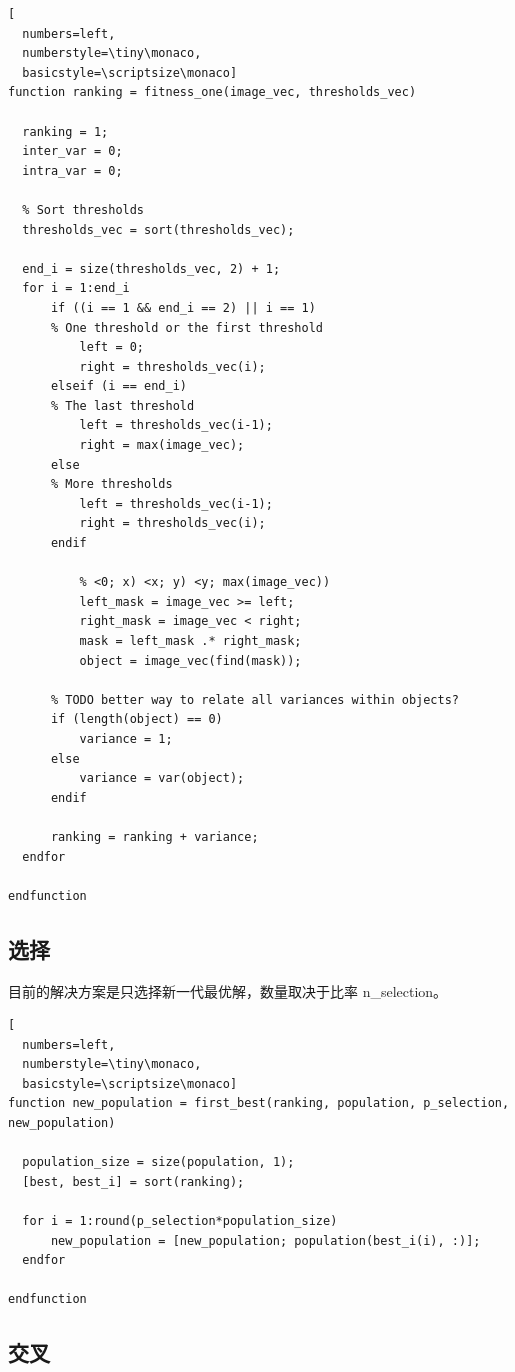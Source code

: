 \documentclass[11pt,a4paper,titlepage]{article}
\begin{document}
\begin{lstlisting}[
  numbers=left,
  numberstyle=\tiny\monaco,
  basicstyle=\scriptsize\monaco]
function ranking = fitness_one(image_vec, thresholds_vec)

  ranking = 1;
  inter_var = 0;
  intra_var = 0;

  % Sort thresholds
  thresholds_vec = sort(thresholds_vec);

  end_i = size(thresholds_vec, 2) + 1;
  for i = 1:end_i
      if ((i == 1 && end_i == 2) || i == 1)
      % One threshold or the first threshold
          left = 0;
          right = thresholds_vec(i);
      elseif (i == end_i)
      % The last threshold
          left = thresholds_vec(i-1);
          right = max(image_vec);
      else
      % More thresholds
          left = thresholds_vec(i-1);
          right = thresholds_vec(i);
      endif

          % <0; x) <x; y) <y; max(image_vec))
          left_mask = image_vec >= left;
          right_mask = image_vec < right;
          mask = left_mask .* right_mask;
          object = image_vec(find(mask));

      % TODO better way to relate all variances within objects?
      if (length(object) == 0)
          variance = 1;
      else
          variance = var(object);
      endif

      ranking = ranking + variance;
  endfor

endfunction
\end{lstlisting}

\subsection{选择}

目前的解决方案是只选择新一代最优解，数量取决于比率 n\_selection。

\begin{lstlisting}[
  numbers=left,
  numberstyle=\tiny\monaco,
  basicstyle=\scriptsize\monaco]
function new_population = first_best(ranking, population, p_selection, new_population)

  population_size = size(population, 1);
  [best, best_i] = sort(ranking);

  for i = 1:round(p_selection*population_size)
      new_population = [new_population; population(best_i(i), :)];
  endfor

endfunction
\end{lstlisting}

\subsection{交叉}
\end{document}
